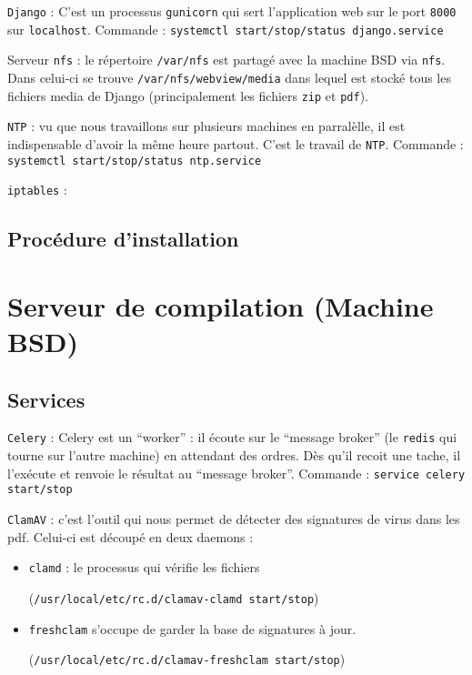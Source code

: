\documentclass[10pt,a4paper]{article}
\begin{document}
\texttt{Django} : C'est un processus \texttt{gunicorn} qui sert l'application web sur le port \texttt{8000} sur \texttt{localhost}.
Commande : \texttt{systemctl start/stop/status django.service}

Serveur \texttt{nfs} : le répertoire \texttt{/var/nfs} est partagé avec la machine BSD via \texttt{nfs}.
Dans celui-ci se trouve \texttt{/var/nfs/webview/media} dans lequel est stocké tous les fichiers media de Django (principalement les fichiers \texttt{zip} et \texttt{pdf}).

\texttt{NTP} : vu que nous travaillons sur plusieurs machines en parralèlle, il est indispensable d'avoir la même heure partout.
C'est le travail de \texttt{NTP}.
Commande : \texttt{systemctl start/stop/status ntp.service}

\texttt{iptables} : %


\subsection{Procédure d'installation}


\section{Serveur de compilation (Machine BSD)}
\subsection{Services}

\texttt{Celery} : Celery est un ``worker'' : il écoute sur le ``message broker'' (le \texttt{redis} qui tourne sur l'autre machine) en attendant des ordres.
Dès qu'il recoit une tache, il l'exécute et renvoie le résultat au ``message broker''.
Commande : \texttt{service celery start/stop}

\texttt{ClamAV} : c'est l'outil qui nous permet de détecter des signatures de virus dans les pdf.
Celui-ci est découpé en deux daemons :
        \begin{itemize}
            \item \texttt{clamd} : le processus qui vérifie les fichiers

            (\texttt{/usr/local/etc/rc.d/clamav-clamd start/stop})
            \item \texttt{freshclam} s'occupe de garder la base de signatures à jour.

            (\texttt{/usr/local/etc/rc.d/clamav-freshclam start/stop})
        \end{itemize}
\end{document}
